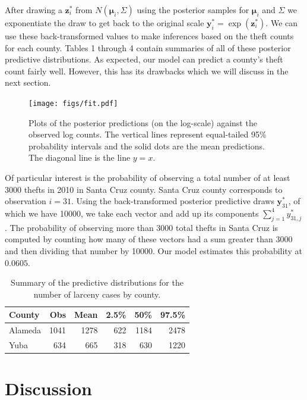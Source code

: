 \documentclass{asaproc}
\newcommand{\m}[1]{\mathbf{\bm{#1}}}
\begin{document}
After drawing a $\m{z}_i^*$ from $N(\m{\mu}_i, \Sigma)$ using the posterior samples for $\m{\mu}_i$ and $\Sigma$ we exponentiate the draw to get back to the original scale $\m{y}_i^*=\exp(\m{z}_i^*)$. We can use these back-transformed values to make inferences based on the theft counts for each county. Tables 1 through 4 contain summaries of all of these posterior predictive distributions. As expected, our model can predict a county's theft count fairly well. However, this has its drawbacks which we will discuss in the next section.

\begin{figure}[ht]
\centering
\texttt{[image: figs/fit.pdf]}
\caption{Plots of the posterior predictions (on the log-scale) against the observed log counts. The vertical lines represent equal-tailed 95\% probability intervals and the solid dots are the mean predictions. The diagonal line is the line $y=x$.}
\label{fit}
\end{figure}

Of particular interest is the probability of observing a total number of at least 3000 thefts in 2010 in Santa Cruz county. Santa Cruz county corresponds to observation $i=31$. Using the back-transformed posterior predictive draws $\m{y}_{31}^*$, of which we have 10000, we take each vector and add up its components $\sum_{j=1}^4 y_{31,j}^*$. The probability of observing more than 3000 total thefts in Santa Cruz is computed by counting how many of these vectors had a sum greater than 3000 and then dividing that number by 10000. Our model estimates this probability at $0.0605$.



\begin{table}[p!]
\caption{\enspace Summary of the predictive distributions for the number of larceny cases by county.}
\centering
\begin{tabular}{lrrrrr}
\\ [-5pt]
County & Obs & Mean & 2.5\% & 50\% & 97.5\% \\ 
  \hline
Alameda & 1041 & 1278 & 622 & 1184 & 2478 \\ 
Yuba & 634 & 665 & 318 & 630 & 1220 \\ 
   \hline
\end{tabular}
\end{table}

\section{Discussion}
\end{document}
